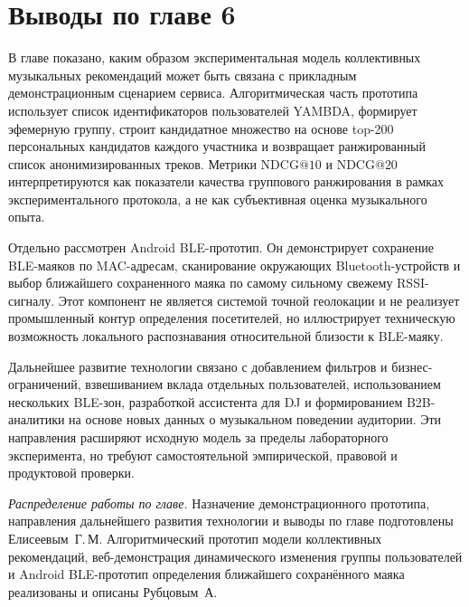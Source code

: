 \section{Выводы по главе 6}
\label{sec:ch6:conclusions}

В главе показано, каким образом экспериментальная модель коллективных музыкальных рекомендаций может быть связана с прикладным демонстрационным сценарием сервиса. Алгоритмическая часть прототипа использует список идентификаторов пользователей YAMBDA, формирует эфемерную группу, строит кандидатное множество на основе top-200 персональных кандидатов каждого участника и возвращает ранжированный список анонимизированных треков. Метрики $\mathrm{NDCG@10}$ и $\mathrm{NDCG@20}$ интерпретируются как показатели качества группового ранжирования в рамках экспериментального протокола, а не как субъективная оценка музыкального опыта.

Отдельно рассмотрен Android BLE-прототип. Он демонстрирует сохранение BLE-маяков по MAC-адресам, сканирование окружающих Bluetooth-устройств и выбор ближайшего сохраненного маяка по самому сильному свежему RSSI-сигналу. Этот компонент не является системой точной геолокации и не реализует промышленный контур определения посетителей, но иллюстрирует техническую возможность локального распознавания относительной близости к BLE-маяку.

Дальнейшее развитие технологии связано с добавлением фильтров и бизнес-ограничений, взвешиванием вклада отдельных пользователей, использованием нескольких BLE-зон, разработкой ассистента для DJ и формированием B2B-аналитики на основе новых данных о музыкальном поведении аудитории. Эти направления расширяют исходную модель за пределы лабораторного эксперимента, но требуют самостоятельной эмпирической, правовой и продуктовой проверки.

\textit{Распределение работы по главе.} Назначение демонстрационного прототипа, направления дальнейшего развития технологии и выводы по главе подготовлены Елисеевым~Г.\,М. Алгоритмический прототип модели коллективных рекомендаций, веб-демонстрация динамического изменения группы пользователей и Android BLE-прототип определения ближайшего сохранённого маяка реализованы и описаны Рубцовым~А.
